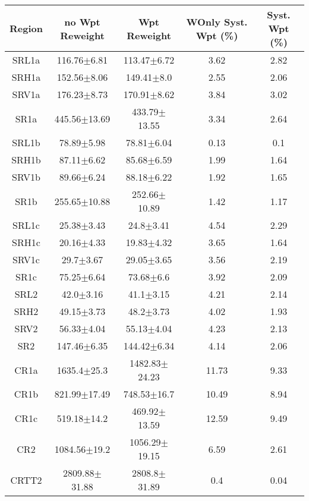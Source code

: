 \documentclass[12pt]{paper}
\begin{document}
\begin{table}[ht]\begin{center}\resizebox{\textwidth}{!}
{\begin{tabular}{c|cc|c|c}
    Region & no Wpt Reweight & Wpt Reweight & WOnly Syst. Wpt (\%) & Syst. Wpt (\%)\\ 
\hline
SRL1a & 116.76$\pm$6.81 & 113.47$\pm$6.72 & 3.62 & 2.82\\ 
SRH1a & 152.56$\pm$8.06 & 149.41$\pm$8.0 & 2.55 & 2.06\\ 
SRV1a & 176.23$\pm$8.73 & 170.91$\pm$8.62 & 3.84 & 3.02\\ 
\hline
SR1a & 445.56$\pm$13.69 & 433.79$\pm$13.55 & 3.34 & 2.64\\ 
\hline
SRL1b & 78.89$\pm$5.98 & 78.81$\pm$6.04 & 0.13 & 0.1\\ 
SRH1b & 87.11$\pm$6.62 & 85.68$\pm$6.59 & 1.99 & 1.64\\ 
SRV1b & 89.66$\pm$6.24 & 88.18$\pm$6.22 & 1.92 & 1.65\\ 
\hline
SR1b & 255.65$\pm$10.88 & 252.66$\pm$10.89 & 1.42 & 1.17\\ 
\hline
SRL1c & 25.38$\pm$3.43 & 24.8$\pm$3.41 & 4.54 & 2.29\\ 
SRH1c & 20.16$\pm$4.33 & 19.83$\pm$4.32 & 3.65 & 1.64\\ 
SRV1c & 29.7$\pm$3.67 & 29.05$\pm$3.65 & 3.56 & 2.19\\ 
\hline
SR1c & 75.25$\pm$6.64 & 73.68$\pm$6.6 & 3.92 & 2.09\\ 
\hline
SRL2 & 42.0$\pm$3.16 & 41.1$\pm$3.15 & 4.21 & 2.14\\ 
SRH2 & 49.15$\pm$3.73 & 48.2$\pm$3.73 & 4.02 & 1.93\\ 
SRV2 & 56.33$\pm$4.04 & 55.13$\pm$4.04 & 4.23 & 2.13\\ 
\hline
SR2 & 147.46$\pm$6.35 & 144.42$\pm$6.34 & 4.14 & 2.06\\ 
\hline
\hline
CR1a & 1635.4$\pm$25.3 & 1482.83$\pm$24.23 & 11.73 & 9.33\\ 
CR1b & 821.99$\pm$17.49 & 748.53$\pm$16.7 & 10.49 & 8.94\\ 
CR1c & 519.18$\pm$14.2 & 469.92$\pm$13.59 & 12.59 & 9.49\\ 
CR2 & 1084.56$\pm$19.2 & 1056.29$\pm$19.15 & 6.59 & 2.61\\ 
CRTT2 & 2809.88$\pm$31.88 & 2808.8$\pm$31.89 & 0.4 & 0.04\\ 

\end{tabular}}
\end{center}\caption*{}\end{table}
\end{document}
